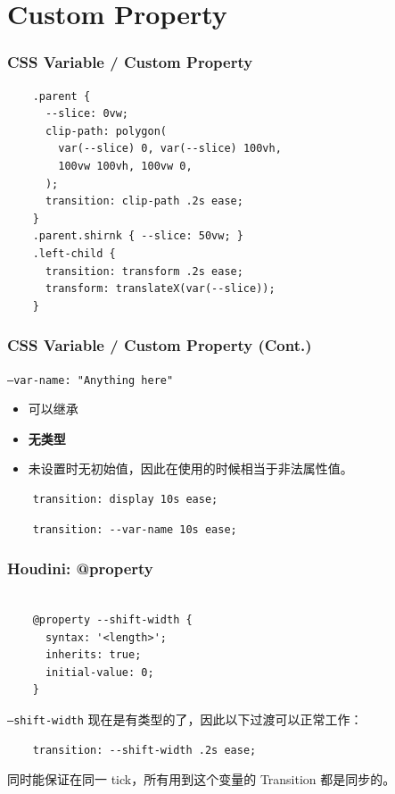\documentclass[UTF-8]{ctexbeamer}
\begin{document}
\section{Custom Property}
\begin{frame}[fragile]
  \frametitle{CSS Variable / Custom Property}

  \begin{verbatim}
    .parent {
      --slice: 0vw;
      clip-path: polygon(
        var(--slice) 0, var(--slice) 100vh, 
        100vw 100vh, 100vw 0,
      );
      transition: clip-path .2s ease;
    }
    .parent.shirnk { --slice: 50vw; }
    .left-child {
      transition: transform .2s ease;
      transform: translateX(var(--slice));
    }
  \end{verbatim}
\end{frame}

\begin{frame}[fragile]
  \frametitle{CSS Variable / Custom Property (Cont.)}
  \texttt{--var-name: "Anything here"}

  \begin{itemize}
    \item 可以继承
    \item \textbf{无类型}
    \item 未设置时无初始值，因此在使用的时候相当于非法属性值。
  \end{itemize}

  \pause
  \vspace{2em}
  \begin{verbatim}
    transition: display 10s ease;
  \end{verbatim}
  \pause
  \begin{verbatim}
    transition: --var-name 10s ease;
  \end{verbatim}
\end{frame}

\begin{frame}[fragile]
  \frametitle{Houdini: @property}
  \begin{verbatim}

    @property --shift-width {
      syntax: '<length>';
      inherits: true;
      initial-value: 0;
    }

  \end{verbatim}

  \pause
  \vspace{1em}

  \texttt{--shift-width} 现在是有类型的了，因此以下过渡可以正常工作：

  \vspace{1em}

  \begin{verbatim}
    transition: --shift-width .2s ease;
  \end{verbatim}

  \pause
  \vspace{1em}

  同时能保证在同一 tick，所有用到这个变量的 Transition 都是同步的。
\end{frame}
\end{document}

